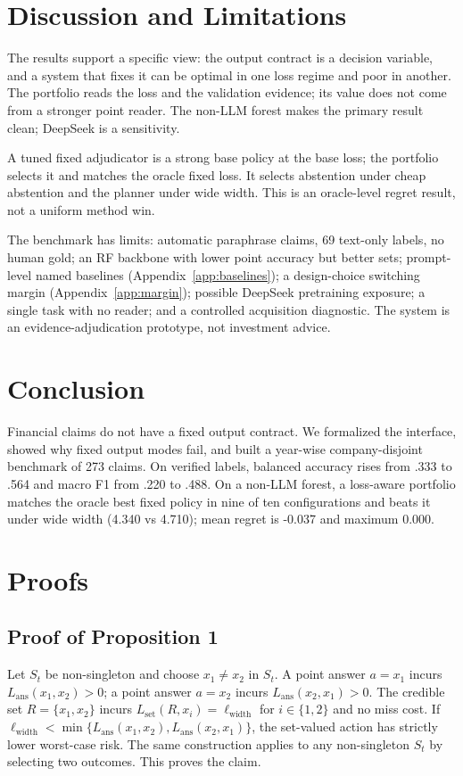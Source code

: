 \documentclass[11pt]{article}
\begin{document}
\section{Discussion and Limitations}
The results support a specific view: the output contract is a decision variable, and a system that fixes it can be optimal in one loss regime and poor in another. The portfolio reads the loss and the validation evidence; its value does not come from a stronger point reader. The non-LLM forest makes the primary result clean; DeepSeek is a sensitivity.

A tuned fixed adjudicator is a strong base policy at the base loss; the portfolio selects it and matches the oracle fixed loss. It selects abstention under cheap abstention and the planner under wide width. This is an oracle-level regret result, not a uniform method win.

The benchmark has limits: automatic paraphrase claims, 69 text-only labels, no human gold; an RF backbone with lower point accuracy but better sets; prompt-level named baselines (Appendix~\ref{app:baselines}); a design-choice switching margin (Appendix~\ref{app:margin}); possible DeepSeek pretraining exposure; a single task with no reader; and a controlled acquisition diagnostic. The system is an evidence-adjudication prototype, not investment advice.

\section{Conclusion}
Financial claims do not have a fixed output contract. We formalized the interface, showed why fixed output modes fail, and built a year-wise company-disjoint benchmark of 273 claims. On verified labels, balanced accuracy rises from .333 to .564 and macro F1 from .220 to .488. On a non-LLM forest, a loss-aware portfolio matches the oracle best fixed policy in nine of ten configurations and beats it under wide width (4.340 vs 4.710); mean regret is -0.037 and maximum 0.000.



\appendix

\section{Proofs}
\label{app:proofs}

\subsection{Proof of Proposition 1}
Let $S_t$ be non-singleton and choose $x_1\neq x_2$ in $S_t$. A point answer $a=x_1$ incurs $L_{\text{ans}}(x_1,x_2)>0$; a point answer $a=x_2$ incurs $L_{\text{ans}}(x_2,x_1)>0$. The credible set $R=\{x_1,x_2\}$ incurs $L_{\text{set}}(R,x_i)=\ell_{\text{width}}$ for $i\in\{1,2\}$ and no miss cost. If $\ell_{\text{width}}<\min\{L_{\text{ans}}(x_1,x_2),L_{\text{ans}}(x_2,x_1)\}$, the set-valued action has strictly lower worst-case risk. The same construction applies to any non-singleton $S_t$ by selecting two outcomes. This proves the claim.
\end{document}
